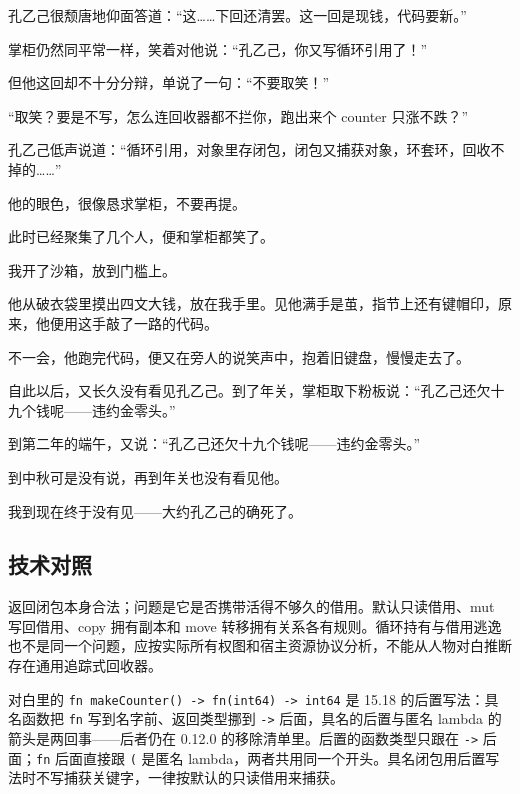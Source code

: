 孔乙己很颓唐地仰面答道：“这……下回还清罢。这一回是现钱，代码要新。”

掌柜仍然同平常一样，笑着对他说：“孔乙己，你又写循环引用了！”

但他这回却不十分分辩，单说了一句：“不要取笑！”

“取笑？要是不写，怎么连回收器都不拦你，跑出来个 counter 只涨不跌？”

孔乙己低声说道：“循环引用，对象里存闭包，闭包又捕获对象，环套环，回收不掉的……”

他的眼色，很像恳求掌柜，不要再提。

此时已经聚集了几个人，便和掌柜都笑了。

我开了沙箱，放到门槛上。

他从破衣袋里摸出四文大钱，放在我手里。见他满手是茧，指节上还有键帽印，原来，他便用这手敲了一路的代码。

不一会，他跑完代码，便又在旁人的说笑声中，抱着旧键盘，慢慢走去了。

自此以后，又长久没有看见孔乙己。到了年关，掌柜取下粉板说：“孔乙己还欠十九个钱呢——违约金零头。”

到第二年的端午，又说：“孔乙己还欠十九个钱呢——违约金零头。”

到中秋可是没有说，再到年关也没有看见他。

我到现在终于没有见——大约孔乙己的确死了。

\subsection*{技术对照}

返回闭包本身合法；问题是它是否携带活得不够久的借用。默认只读借用、mut 写回借用、copy 拥有副本和 move 转移拥有关系各有规则。循环持有与借用逃逸也不是同一个问题，应按实际所有权图和宿主资源协议分析，不能从人物对白推断存在通用追踪式回收器。

对白里的 \texttt{fn make\allowbreak{}Counter(\allowbreak{})\allowbreak{} -\allowbreak{}>\allowbreak{} fn(\allowbreak{}int64)\allowbreak{} -\allowbreak{}>\allowbreak{} int64} 是 15.18 的后置写法：具名函数把 \texttt{fn} 写到名字前、返回类型挪到 \texttt{-\allowbreak{}>\allowbreak{}} 后面，具名的后置与匿名 lambda 的箭头是两回事——后者仍在 0.12.0 的移除清单里。后置的函数类型只跟在 \texttt{-\allowbreak{}>\allowbreak{}} 后面；\texttt{fn} 后面直接跟 \texttt{(\allowbreak{}} 是匿名 lambda，两者共用同一个开头。具名闭包用后置写法时不写捕获关键字，一律按默认的只读借用来捕获。
